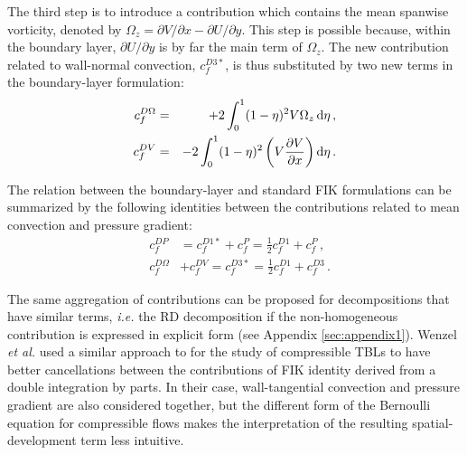 The third step is to introduce a contribution which contains the mean spanwise vorticity, denoted by $\Omega_z=\partial V / \partial x -\partial U / \partial y$. This step is possible because, within the boundary layer, $\partial U / \partial y$ is by far the main term of $\Omega_z$. The new contribution related to wall-normal convection, $c^{D3*}_f$, is thus substituted by two new terms in the boundary-layer formulation: 
\begin{eqnarray}
    c^{D\Omega}_f &=& +2 \int_0^1 (1-\eta)^2 V \Omega_z \, {\rm d}\eta \,,\\
    c^{DV}_f &=& -2 \int_0^1 (1-\eta)^2 \left ( V \frac{\partial V}{\partial x} \right ) {\rm d} \eta\,.
\end{eqnarray}

The relation between the boundary-layer and standard FIK formulations can be summarized by the following identities between the contributions related to mean convection and pressure gradient:
\begin{eqnarray}
    &c^{DP}_f& = c^{D1*}_f + c^P_f = \frac 12 c^{D1}_f+c^P_f\,,\\
    &c^{D\Omega}_f& + c^{DV}_f = c^{D3*}_f  = \frac 12 c^{D1}_f + c^{D3}_f \,.
\end{eqnarray}


The same aggregation of contributions can be proposed for decompositions that have similar terms, \textit{i.e.\!} the RD decomposition if the non-homogeneous contribution is expressed in explicit form (see Appendix \ref{sec:appendix1}). Wenzel \textit{et al.}\cite{wenz22} used a similar approach to for the study of compressible TBLs to have better cancellations between the contributions of FIK identity derived from a double integration by parts. In their case, wall-tangential convection and pressure gradient are also considered together, but the different form of the Bernoulli equation for compressible flows makes the interpretation of the resulting spatial-development term less intuitive.


